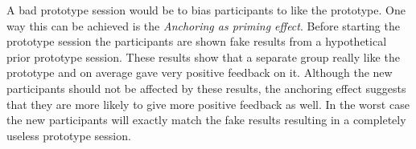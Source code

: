 \documentclass[Main.tex]{subfiles}
\begin{document}
\label{anchor}
A bad prototype session would be to bias participants to like the prototype. One way this can be achieved is the \emph{Anchoring as priming effect}. Before starting the prototype session the participants are shown fake results from a hypothetical prior prototype session. These results show that a separate group really like the prototype and on average gave very positive feedback on it. Although the new participants should not be affected by these results, the anchoring effect suggests that they are more likely to give more positive feedback as well. In the worst case the new participants will exactly match the fake results resulting in a completely useless prototype session.
\end{document}
